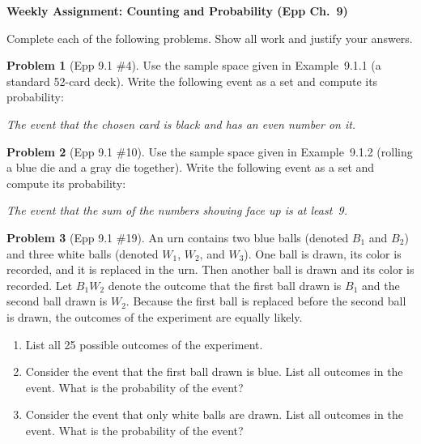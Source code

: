 \documentclass[11pt]{article}
\begin{document}
\begin{center}
  {\Large\bfseries Weekly Assignment: Counting and Probability (Epp Ch.\ 9)}
\end{center}

\bigskip

\noindent
Complete each of the following problems.  Show all work and justify your answers.

\bigskip

\noindent\textbf{Problem 1} (Epp 9.1 \#4). \;
Use the sample space given in Example~9.1.1 (a standard 52-card deck).
Write the following event as a set and compute its probability:

\medskip
\emph{The event that the chosen card is black and has an even number on it.}

\bigskip

\noindent\textbf{Problem 2} (Epp 9.1 \#10). \;
Use the sample space given in Example~9.1.2 (rolling a blue die and a gray die
together).  Write the following event as a set and compute its probability:

\medskip
\emph{The event that the sum of the numbers showing face up is at least~9.}

\bigskip

\noindent\textbf{Problem 3} (Epp 9.1 \#19). \;
An urn contains two blue balls (denoted $B_1$ and $B_2$) and three white balls
(denoted $W_1$, $W_2$, and $W_3$).  One ball is drawn, its color is recorded,
and it is replaced in the urn.  Then another ball is drawn and its color is recorded.
Let $B_1 W_2$ denote the outcome that the first ball drawn is $B_1$ and the
second ball drawn is $W_2$.  Because the first ball is replaced before the second
ball is drawn, the outcomes of the experiment are equally likely.
\begin{enumerate}[label=\alph*.]
  \item List all 25 possible outcomes of the experiment.
  \item Consider the event that the first ball drawn is blue.
        List all outcomes in the event.  What is the probability of the event?
  \item Consider the event that only white balls are drawn.
        List all outcomes in the event.  What is the probability of the event?
\end{enumerate}

\bigskip
\end{document}
